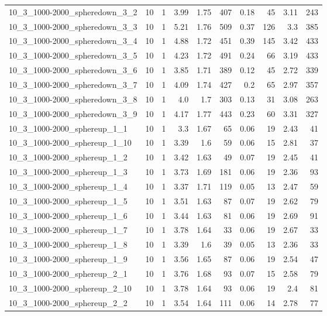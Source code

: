 \begin{center}
\begin{scriptsize}
\begin{longtable}{lrrrrrrrrr}
10\_3\_1000-2000\_spheredown\_3\_2 & 10 & 1 & 3.99 & 1.75 & 407 & 0.18 & 45 & 3.11 & 243\\
10\_3\_1000-2000\_spheredown\_3\_3 & 10 & 1 & 5.21 & 1.76 & 509 & 0.37 & 126 & 3.3 & 385\\
10\_3\_1000-2000\_spheredown\_3\_4 & 10 & 1 & 4.88 & 1.72 & 451 & 0.39 & 145 & 3.42 & 433\\
10\_3\_1000-2000\_spheredown\_3\_5 & 10 & 1 & 4.23 & 1.72 & 491 & 0.24 & 66 & 3.19 & 433\\
10\_3\_1000-2000\_spheredown\_3\_6 & 10 & 1 & 3.85 & 1.71 & 389 & 0.12 & 45 & 2.72 & 339\\
10\_3\_1000-2000\_spheredown\_3\_7 & 10 & 1 & 4.09 & 1.74 & 427 & 0.2 & 65 & 2.97 & 357\\
10\_3\_1000-2000\_spheredown\_3\_8 & 10 & 1 & 4.0 & 1.7 & 303 & 0.13 & 31 & 3.08 & 263\\
10\_3\_1000-2000\_spheredown\_3\_9 & 10 & 1 & 4.17 & 1.77 & 443 & 0.23 & 60 & 3.31 & 327\\
10\_3\_1000-2000\_sphereup\_1\_1 & 10 & 1 & 3.3 & 1.67 & 65 & 0.06 & 19 & 2.43 & 41\\
10\_3\_1000-2000\_sphereup\_1\_10 & 10 & 1 & 3.39 & 1.6 & 59 & 0.06 & 15 & 2.81 & 37\\
10\_3\_1000-2000\_sphereup\_1\_2 & 10 & 1 & 3.42 & 1.63 & 49 & 0.07 & 19 & 2.45 & 41\\
10\_3\_1000-2000\_sphereup\_1\_3 & 10 & 1 & 3.73 & 1.69 & 181 & 0.06 & 19 & 2.36 & 93\\
10\_3\_1000-2000\_sphereup\_1\_4 & 10 & 1 & 3.37 & 1.71 & 119 & 0.05 & 13 & 2.47 & 59\\
10\_3\_1000-2000\_sphereup\_1\_5 & 10 & 1 & 3.51 & 1.63 & 87 & 0.07 & 19 & 2.62 & 79\\
10\_3\_1000-2000\_sphereup\_1\_6 & 10 & 1 & 3.44 & 1.63 & 81 & 0.06 & 19 & 2.69 & 91\\
10\_3\_1000-2000\_sphereup\_1\_7 & 10 & 1 & 3.78 & 1.64 & 33 & 0.06 & 19 & 2.67 & 33\\
10\_3\_1000-2000\_sphereup\_1\_8 & 10 & 1 & 3.39 & 1.6 & 39 & 0.05 & 13 & 2.36 & 33\\
10\_3\_1000-2000\_sphereup\_1\_9 & 10 & 1 & 3.56 & 1.65 & 87 & 0.06 & 19 & 2.54 & 47\\
10\_3\_1000-2000\_sphereup\_2\_1 & 10 & 1 & 3.76 & 1.68 & 93 & 0.07 & 15 & 2.58 & 79\\
10\_3\_1000-2000\_sphereup\_2\_10 & 10 & 1 & 3.78 & 1.64 & 93 & 0.06 & 19 & 2.4 & 81\\
10\_3\_1000-2000\_sphereup\_2\_2 & 10 & 1 & 3.54 & 1.64 & 111 & 0.06 & 14 & 2.78 & 77\\

\end{longtable}
\end{scriptsize}
\end{center}
